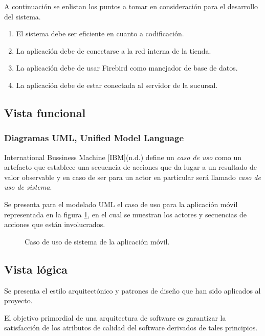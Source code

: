 A continuación se enlistan los puntos a tomar en consideración para el desarrollo del sistema.

\begin{enumerate}
	\item El sistema debe ser eficiente en cuanto a codificación.
	\item La aplicación debe de conectarse a la red interna de la tienda.
	\item La aplicación debe de usar Firebird como manejador de base de datos.
	\item La aplicación debe de estar conectada al servidor de la sucursal.
\end{enumerate}

\subsection{Vista funcional}

\subsubsection{Diagramas UML, Unified Model Language}
International Bussiness Machine [IBM](n.d.) define un \textit{caso de uso} como un artefacto que establece una secuencia de acciones que da lugar a un resultado de valor observable y en caso de ser para un actor en particular será llamado \textit{caso de uso de sistema}.

Se presenta para el modelado UML el caso de uso para la aplicación móvil representada en la figura \ref{caso_de_uso}, en el cual se muestran los actores y secuencias de acciones que están involucrados.

\begin{figure}[h]
	\centering
	
	\caption{Caso de uso de sistema de la aplicación móvil.}
	\label{caso_de_uso}
\end{figure}

\subsection{Vista lógica}
Se presenta el estilo arquitectónico y patrones de diseño que han sido aplicados al proyecto.

El objetivo primordial de una arquitectura de software es garantizar la satisfacción de los atributos de calidad del software derivados de tales principios.

